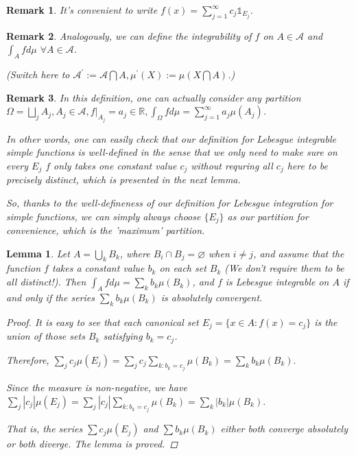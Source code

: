 \documentclass[12pt]{article}
\theoremstyle{blueplain}
\newtheorem{lemma}[theorem]{Lemma}
\theoremstyle{bluedef}
\theoremstyle{blueremark}
\newtheorem{remark}{Remark}[section]
\newcommand{\R}{\mathbb{R}}
\numberwithin{equation}{section}
\begin{document}
\begin{remark}
  It's convenient to write $f(x) = \sum_{j=1}^{\infty} c_j \mathds{1}_{E_j}$.
\end{remark}

\begin{remark}
  Analogously, we can define the integrability of $f$ on $A \in \mathcal{A}$ and $\int_{A} f d\mu$ $\forall A \in \mathcal{A}$.

  (Switch here to $\mathcal{A}^{\prime} := \mathcal{A} \bigcap A, \mu^{\prime}(X) := \mu(X \bigcap A)$.)
\end{remark}

\begin{remark}
  In this definition, one can actually consider any partition $\Omega = \bigsqcup_j A_j, A_j \in \mathcal{A}, f|_{A_j} = a_j \in \R, \int_{\Omega} f d\mu = \sum_{j=1}^{\infty}a_j \mu(A_j)$.

  In other words, one can easily check that our definition for Lebesgue integrable simple functions is well-defined in the sense that we only need to make sure on every $E_j$ $f$ only takes one constant value $c_j$ without requring all $c_j$ here to be precisely distinct, which is presented in the next lemma.

  So, thanks to the well-defineness of our definition for Lebesgue integration for simple functions, we can simply always choose $\{E_j\}$ as our partition for convenience, which is the 'maximum' partition.
\end{remark}

\begin{lemma}
  Let $A = \bigcup_k B_k$, where $B_i \cap B_j = \varnothing$ when $i \neq j$, and assume that the function $f$ takes a constant value $b_k$ on each set $B_k$ (We don't require them to be all distinct!). Then $\int_A f d\mu = \sum_k b_k \mu(B_k)$, and $f$ is Lebesgue integrable on $A$ if and only if the series $\sum_k b_k \mu(B_k)$ is absolutely convergent.
  \begin{proof}
    It is easy to see that each canonical set
    \(E_j = \{ x \in A : f(x) = c_j \}\)
    is the union of those sets $B_k$ satisfying $b_k = c_j$.

    Therefore,
    \(\sum_j c_j \mu(E_j) = \sum_j c_j \sum_{k: b_k = c_j} \mu(B_k) = \sum_k b_k \mu(B_k).\)

    Since the measure is non-negative, we have
    \(\sum_j |c_j| \mu(E_j) = \sum_j |c_j| \sum_{k: b_k = c_j} \mu(B_k) = \sum_k |b_k| \mu(B_k).\)

    That is, the series $\sum c_j \mu(E_j)$ and $\sum b_k \mu(B_k)$ either both converge absolutely or both diverge. The lemma is proved.
  \end{proof}
\end{lemma}
\end{document}
